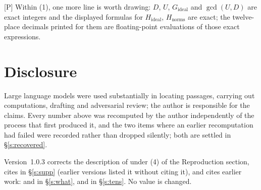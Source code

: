 \documentclass[11pt]{article}
\theoremstyle{plain}
\theoremstyle{definition}
\begin{document}
\textup{[P]} Within (1), one more line is worth drawing: $D$, $U$, $G_{\mathrm{ideal}}$
and $\gcd(U,D)$ are exact integers and the displayed formulas for
$H_{\mathrm{ideal}}$, $H_{\mathrm{norms}}$ are exact; the twelve-place decimals printed
for them are floating-point evaluations of those exact expressions.

\section*{Disclosure}

Large language models were used substantially in locating passages, carrying out
computations, drafting and adversarial review; the author is responsible for the claims.
Every number above was recomputed by the author independently of the process that first
produced it, and the two items where an earlier recomputation had failed were
recorded rather than dropped silently; both are settled in \S\ref{s:recovered}.

Version~1.0.3 corrects the description of \cite{First} under (4) of the Reproduction
section, cites \cite{DH25} in \S\ref{s:supp} (earlier versions listed it without citing
it), and cites earlier work: \cite{Zhou} and \cite{TK} in \S\ref{s:what}, and
\cite{DHPS} in \S\ref{s:tens}.  No value is changed.
\end{document}
